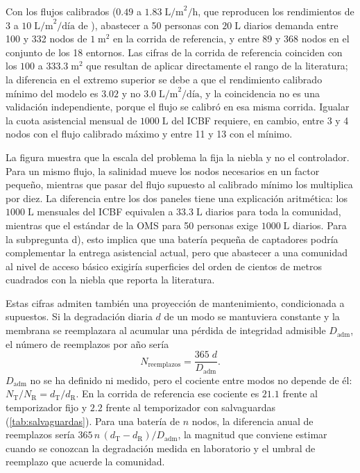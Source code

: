 Con los flujos calibrados ($0.49$ a $1.83\;\text{L/m}^2\text{/h}$, que reproducen los rendimientos de $3$ a $10\;\text{L/m}^2\text{/d\'ia}$ de \textcite{klemm2012fog}), abastecer a 50 personas con $20\;\text{L}$ diarios demanda entre 100 y 332 nodos de $1\;\text{m}^2$ en la corrida de referencia, y entre 89 y 368 nodos en el conjunto de los 18 entornos. Las cifras de la corrida de referencia coinciden con los $100$ a $333.3\;\text{m}^2$ que resultan de aplicar directamente el rango de la literatura; la diferencia en el extremo superior se debe a que el rendimiento calibrado m\'inimo del modelo es $3.02$ y no $3.0\;\text{L/m}^2\text{/d\'ia}$, y la coincidencia no es una validaci\'on independiente, porque el flujo se calibr\'o en esa misma corrida. Igualar la cuota asistencial mensual de $1000\;\text{L}$ del ICBF requiere, en cambio, entre 3 y 4 nodos con el flujo calibrado m\'aximo y entre 11 y 13 con el m\'inimo.

La figura muestra que la escala del problema la fija la niebla y no el controlador. Para un mismo flujo, la salinidad mueve los nodos necesarios en un factor peque\~no, mientras que pasar del flujo supuesto al calibrado m\'inimo los multiplica por diez. La diferencia entre los dos paneles tiene una explicaci\'on aritm\'etica: los $1000\;\text{L}$ mensuales del ICBF equivalen a $33.3\;\text{L}$ diarios para toda la comunidad, mientras que el est\'andar de la OMS para 50 personas exige $1000\;\text{L}$ diarios. Para la subpregunta d), esto implica que una bater\'ia peque\~na de captadores podr\'ia complementar la entrega asistencial actual, pero que abastecer a una comunidad al nivel de acceso b\'asico exigir\'ia superficies del orden de cientos de metros cuadrados con la niebla que reporta la literatura.

Estas cifras admiten tambi\'en una proyecci\'on de mantenimiento, condicionada a supuestos. Si la degradaci\'on diaria $d$ de un modo se mantuviera constante y la membrana se reemplazara al acumular una p\'erdida de integridad admisible $D_{\text{adm}}$, el n\'umero de reemplazos por a\~no ser\'ia
\begin{equation}
  N_{\text{reemplazos}} = \frac{365\; d}{D_{\text{adm}}}.
\end{equation}
$D_{\text{adm}}$ no se ha definido ni medido, pero el cociente entre modos no depende de \'el: $N_{\text{T}}/N_{\text{R}} = d_{\text{T}}/d_{\text{R}}$. En la corrida de referencia ese cociente es $21.1$ frente al temporizador fijo y $2.2$ frente al temporizador con salvaguardas (\cref{tab:salvaguardas}). Para una bater\'ia de $n$ nodos, la diferencia anual de reemplazos ser\'ia $365\,n\,(d_{\text{T}} - d_{\text{R}})/D_{\text{adm}}$, la magnitud que conviene estimar cuando se conozcan la degradaci\'on medida en laboratorio y el umbral de reemplazo que acuerde la comunidad.

